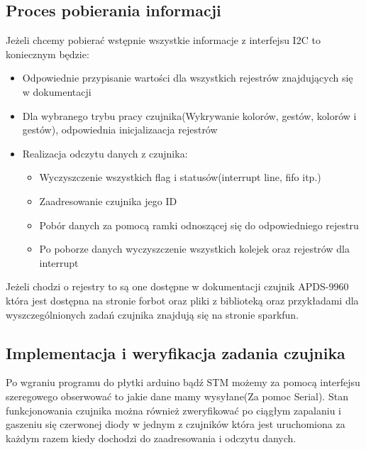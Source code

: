 \documentclass[11pt, a4paper]{article}
\begin{document}
\subsection{Proces pobierania informacji}
Jeżeli chcemy pobierać wstępnie wszystkie informacje z interfejsu I2C to koniecznym będzie:
\begin{itemize}
    \item Odpowiednie przypisanie wartości dla wszystkich rejestrów znajdujących się w dokumentacji
    \item Dla wybranego trybu pracy czujnika(Wykrywanie kolorów, gestów, kolorów i gestów), odpowiednia inicjalizaacja rejestrów
    \item Realizacja odczytu danych z czujnika:
    \begin{itemize}
        \item Wyczyszczenie wszystkich flag i statusów(interrupt line, fifo itp.)
        \item Zaadresowanie czujnika jego ID
        \item Pobór danych za pomocą ramki odnoszącej się do odpowiedniego rejestru
        \item Po poborze danych wyczyszczenie wszystkich kolejek oraz rejestrów dla interrupt
    \end{itemize}
\end{itemize}
Jeżeli chodzi o rejestry to są one dostępne w dokumentacji czujnik APDS-9960 która jest dostępna na stronie forbot\cite{FORBOT} oraz pliki z biblioteką oraz przykładami dla wyszczególnionych zadań czujnika znajdują się na stronie sparkfun\cite{PRZEWODNIK}.
\subsection{Implementacja i weryfikacja zadania czujnika}
Po wgraniu programu do płytki arduino bądź STM możemy za pomocą interfejsu szeregowego obserwować to jakie dane mamy wysyłane(Za pomoc Serial). Stan funkcjonowania czujnika można również zweryfikować po ciągłym zapalaniu i gaszeniu się czerwonej diody w jednym z czujników która jest uruchomiona za każdym razem kiedy dochodzi do zaadresowania i odczytu danych.
\end{document}

